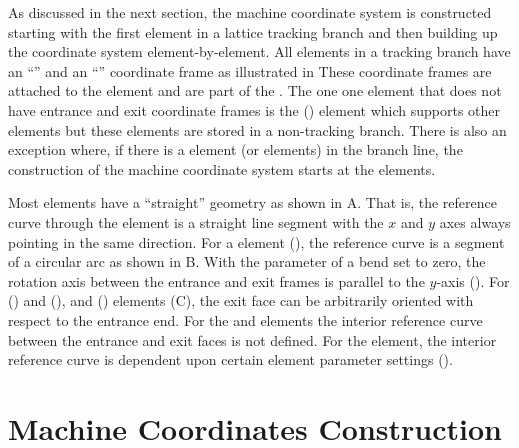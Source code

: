 As discussed in the next section, the machine coordinate system is constructed starting with the first
element in a lattice tracking branch and then building up the coordinate system element-by-element.
All elements in a tracking branch have an ``'' and an ``'' coordinate frame as
illustrated in 
These coordinate frames are attached to the element and are part of the . 
The one one element that does not have entrance and exit coordinate frames
is the  () element which supports other elements but these
elements are stored in a non-tracking branch. There
is also an exception where, if there is a  element (or elements)
in the branch line, the construction of the machine coordinate system starts at the 
elements.


Most elements have a ``straight'' geometry as shown in
A. That is, the reference curve through the element is a straight line
segment with the $x$ and $y$ axes always pointing in the same direction. For a  element
(), the reference curve is a segment of a circular arc as shown in
B. With the  parameter of a bend set to zero, the rotation axis
between the entrance and exit frames is parallel to the $y$-axis (). 
For  () and  (), 
and  () elements (C), the exit face can be
arbitrarily oriented with respect to the entrance end. 
For the  and  elements the interior reference curve between the
entrance and exit faces is not defined. For the  element, the interior reference curve 
is dependent upon certain  element parameter settings ().

\section{Machine Coordinates Construction}
\label{s:ref.construct}

